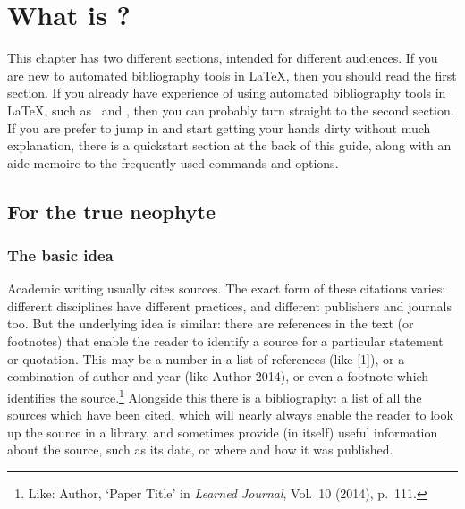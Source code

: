 \chapter{What is ?}\label{ch:introduction}

This chapter has two different sections, intended for different
audiences. If you are new to automated bibliography tools in \LaTeX,
then you should read the first section. If
you already have experience of using automated bibliography tools in
\LaTeX, such as \bibtex\ and , then you can probably
turn straight to the second section. If you
are prefer to jump in and start getting your hands dirty without much
explanation, there is a quickstart section at the back of this
guide, along with an aide memoire to
the frequently used commands and
options.

\section{For the true neophyte}

\subsection{The basic idea}
\label{newbie}

Academic writing usually cites sources. The exact form of these
citations varies: different disciplines have different practices, and
different publishers and journals too. But the underlying idea is
similar: there are references in the text (or footnotes) that enable
the reader to identify a source for a particular statement or
quotation. This may be a number in a list of references (like [1]),
or a combination of author and year (like Author 2014), or even a
footnote which identifies the source.\footnote{Like: Author, `Paper
  Title' in \emph{Learned Journal}, Vol.\ 10 (2014), p.\ 111.}
Alongside this there is a bibliography: a list of all the sources
which have been cited, which will nearly always enable the reader to
look up the source in a library, and sometimes provide (in itself)
useful information about the source, such as its date, or where
and how it was published.

